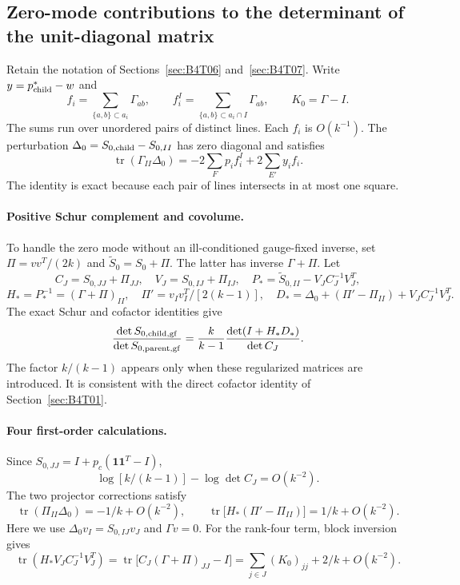 \subsection{Zero-mode contributions to the determinant of the unit-diagonal matrix}\label{sec:B4T08}
Retain the notation of Sections~\ref{sec:B4T06} and~\ref{sec:B4T07}. Write $y=p^*_{\rm child}-w$ and
\[
 f_i=\sum_{\{a,b\}\subset a_i}\Gamma_{ab},\qquad
 f_i^I=\sum_{\{a,b\}\subset a_i\cap I}\Gamma_{ab},
 \qquad K_0=\Gamma-I.
\]
The sums run over unordered pairs of distinct lines. Each $f_i$ is $O(k^{-1})$.
The perturbation $\Delta_0=S_{0,\rm child}-S_{0,II}$ has zero diagonal and satisfies
\[
 \operatorname{tr}(\Gamma_{II}\Delta_0)
 =-2\sum_Fp_i f_i^I+2\sum_{E'}y_i f_i.
\]
The identity is exact because each pair of lines intersects in at most one square.

\paragraph{Positive Schur complement and covolume.}
To handle the zero mode without an ill-conditioned gauge-fixed inverse, set $\Pi=vv^T/(2k)$ and $\widetilde
S_0=S_0+\Pi$.
The latter has inverse $\Gamma+\Pi$. Let
\[
 C_J=S_{0,JJ}+\Pi_{JJ},\quad V_J=S_{0,IJ}+\Pi_{IJ},\quad
 P_*=\widetilde S_{0,II}-V_J C_J^{-1}V_J^T,
\]
\[
 H_*=P_*^{-1}=(\Gamma+\Pi)_{II},\quad
 \Pi'=v_Iv_I^T/[2(k-1)],\quad
 D_*=\Delta_0+(\Pi'-\Pi_{II})+V_JC_J^{-1}V_J^T.
\]
The exact Schur and cofactor identities give
\[
 \frac{\det S_{0,\rm child,gf}}{\det S_{0,\rm parent,gf}}
 =\frac{k}{k-1}\frac{\det(I+H_*D_*)}{\det C_J}.
\]
The factor $k/(k-1)$ appears only when these regularized matrices are introduced. It is consistent with the
direct cofactor identity of Section~\ref{sec:B4T01}.

\paragraph{Four first-order calculations.}
Since $S_{0,JJ}=I+p_c(\mathbf1\mathbf1^T-I)$,
\[
 \log[k/(k-1)]-\log\det C_J=O(k^{-2}).
\]
The two projector corrections satisfy
\[
 \operatorname{tr}(\Pi_{II}\Delta_0)=-1/k+O(k^{-2}),\qquad
 \operatorname{tr}\big[H_*(\Pi'-\Pi_{II})\big]=1/k+O(k^{-2}).
\]
Here we use $\Delta_0v_I=S_{0,IJ}v_J$ and $\Gamma v=0$.
For the rank-four term, block inversion gives
\[
 \operatorname{tr}(H_*V_JC_J^{-1}V_J^T)
 =\operatorname{tr}\big[C_J(\Gamma+\Pi)_{JJ}-I\big]
 =\sum_{j\in J}(K_0)_{jj}+2/k+O(k^{-2}).
\]

